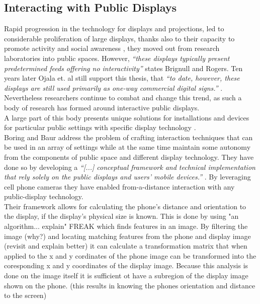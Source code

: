 \subsection{Interacting with Public Displays}
Rapid progression in the technology for displays and projections, led to considerable proliferation of large displays, thanks also to their capacity to promote activity and social awareness \cite{Huang:2003}, they moved out from research laboratories into public spaces. 
However, \emph{``these displays typically present predetermined feeds offering no interactivity''} \cite{Brignull:2003} states Brignull and Rogers. 
Ten years later Ojala et. al still support this thesis, that \emph{``to date, however, these displays are still used primarily as one-way commercial digital signs.''} \cite{Ojala:2012:MIP:2225044.2225065}. \\

Nevertheless researchers continue to combat and change this trend, as such a body of research has formed around interactive public displays. \\

A large part of this body presents unique  solutions for installations and devices for particular public settings with specific display technology \cite{Schieck:2012:AEM:2393132.2393141}.\\

Boring and Baur address the problem of crafting interaction techniques that can be used in an array of settings while at the same time maintain some autonomy from the components of public space and different display technology. %
They have done so by developing a \emph{``[...] conceptual framework and technical implementation that rely solely on the public displays and users' mobile devices.''} \cite{Boring:2013}. By  leveraging cell phone cameras they have enabled from-a-distance interaction with any public-display technology.\\
Their framework allows for calculating the phone's distance and orientation to the display, if the display's physical size is known.
This is done by using "an algorithm... explain" FREAK which finds features
in an image. By filtering the image (why?) and locating matching features
from the phone and display image (revisit and explain better) it can calculate
a transformation matrix that when applied to the x and y cordinates of the 
phone image can be transformed into the coresponding x and y coordinates
of the display image.
Because this analysis is done on the image itself  it is sufficient ot have a
subregion of the display image shown on the phone.
(this  results in knowing the phones orientation and distance to  the screen)

